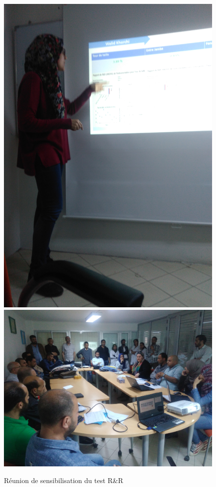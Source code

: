 \documentclass[12pt, a4paper]{thesis}
\begin{document}
\begin{figure}[!h]
\begin{center}
\includegraphics[scale=0.05]{moi.jpg}
\includegraphics[scale=0.06]{euxbl7a9.jpg}
\caption{Réunion de sensibilisation du test R\&R}
\end{center}
\end{figure}
\end{document}
